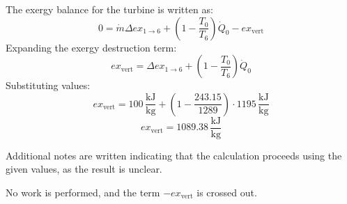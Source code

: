 The exergy balance for the turbine is written as:  
\[
0 = \dot{m} \Delta ex_{1 \to 6} + \left( 1 - \frac{T_0}{T_6} \right) \dot{Q}_0 - ex_{\text{vert}}
\]  
Expanding the exergy destruction term:  
\[
ex_{\text{vert}} = \Delta ex_{1 \to 6} + \left( 1 - \frac{T_0}{T_6} \right) \dot{Q}_0
\]  
Substituting values:  
\[
ex_{\text{vert}} = 100 \, \frac{\text{kJ}}{\text{kg}} + \left( 1 - \frac{243.15}{1289} \right) \cdot 1195 \, \frac{\text{kJ}}{\text{kg}}
\]  
\[
ex_{\text{vert}} = 1089.38 \, \frac{\text{kJ}}{\text{kg}}
\]  

Additional notes are written indicating that the calculation proceeds using the given values, as the result is unclear.  

No work is performed, and the term \( -ex_{\text{vert}} \) is crossed out.